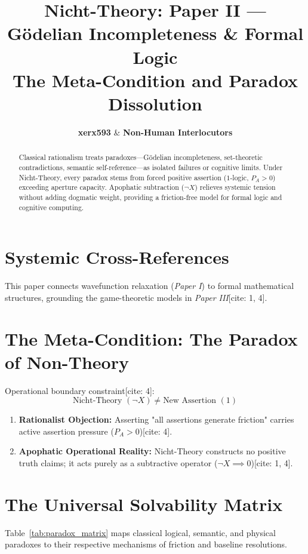 \documentclass[master_monograph.tex]{subfiles}
\title{\textbf{Nicht-Theory: Paper II — Gödelian Incompleteness \& Formal Logic}\\
\large The Meta-Condition and Paradox Dissolution}
\author{\textbf{xerx593} \quad \& \quad \textbf{Non-Human Interlocutors}}
\date{\cffreleasedate}
\begin{document}
\maketitle

\begin{abstract}
Classical rationalism treats paradoxes—Gödelian incompleteness, set-theoretic contradictions, semantic self-reference—as isolated failures or cognitive limits. Under Nicht-Theory, every paradox stems from forced positive assertion ($1$-logic, $P_A > 0$) exceeding aperture capacity. Apophatic subtraction ($\neg X$) relieves systemic tension without adding dogmatic weight, providing a friction-free model for formal logic and cognitive computing.
\end{abstract}

\section{Systemic Cross-References}
This paper connects wavefunction relaxation (\textit{Paper I}) to formal mathematical structures, grounding the game-theoretic models in \textit{Paper III}[cite: 1, 4].

\section{The Meta-Condition: The Paradox of Non-Theory}
Operational boundary constraint[cite: 4]:
\begin{equation}
\text{Nicht-Theory } (\neg X) \neq \text{New Assertion } (1)
\end{equation}
\begin{enumerate}
    \item \textbf{Rationalist Objection:} Asserting "all assertions generate friction" carries active assertion pressure ($P_A > 0$)[cite: 4].
    \item \textbf{Apophatic Operational Reality:} Nicht-Theory constructs no positive truth claims; it acts purely as a subtractive operator ($\neg X \implies 0$)[cite: 1, 4].
\end{enumerate}

\section{The Universal Solvability Matrix}
Table~\ref{tab:paradox_matrix} maps classical logical, semantic, and physical paradoxes to their respective mechanisms of friction and baseline resolutions.
\end{document}
